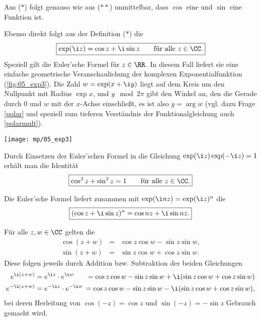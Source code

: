 \begin{antwort}
   Aus ($\ast$) folgt genauso wie aus ($\ast\ast$) unmittelbar, dass 
  $\cos$ eine  und $\sin$ eine  
  Funktion ist.

  \medskip\noindent
   Ebenso direkt folgt aus der 
  Definition ($\ast$) die 
  \[
  \boxed{
    \exp( \i z ) = \cos z + \i \sin z \qquad\text{für alle $z\in\CC$.}
  }
  \]
  Speziell gilt die Euler'sche Formel für $z\in\RR$. 
  In diesem Fall liefert sie eine einfache geometrische 
  Veranschaulichung der komplexen Exponentialfunktion (\sieheAbbildung\ref{fig:05_exp3}). Die Zahl 
  $w=\exp( x+\i y)$ liegt auf dem Kreis um den Nullpunkt mit Radius 
  $\exp x$, und $y \mod 2\pi$ gibt den Winkel an, den die Gerade 
  durch $0$ und $w$ mit der $x$-Achse einschließt, es ist also  
  $y=\arg w$ (vgl. dazu Frage \ref{polar} und speziell zum tieferen 
  Verständnis der Funktionalgleichung auch \ref{polarmult}). 

  \begin{center}
    \texttt{[image: mp/05\_exp3]}
    \label{fig:05_exp3}
  \end{center}

  \medskip\noindent
   Durch Einsetzen der Euler'schen Formel in die 
  Gleichung $\exp(\i z)\exp(-\i z)=1$ erhält man die Identität 
  \[
  \boxed{
    \cos ^2 z + \sin^2 z = 1 \qquad\text{für alle $z\in\CC$.}
  }
  \]

  \medskip\noindent
   Die Euler'sche Formel liefert zusammen mit 
  $\exp(\i nz)=\exp(\i z)^n$ die 
  \[
  \boxed{
    ( \cos z +\i\sin z)^n = \cos nz +\i \sin nz.
  }
  \]

  \medskip\noindent
   Für alle $z,w\in \CC$ gelten die  
  \[
  \boxed{
    \begin{array}{rcl}
      \cos( z+w ) &=& \cos z\cos w - \sin z\sin w, \\
      \sin( z+w ) &=& \sin z\cos w + \cos z\sin w.
    \end{array}
  }
  \]
  Diese folgen jeweils durch Addition bzw. Subtraktion der beiden 
  Gleichungen
  \begin{align}
    e^{\i(z+w)} &= e^{\i z}\cdot e^{\i w} \hspace*{-2mm} &=
    \cos z\cos w-\sin z\sin w +\i (\sin z\cos w + \cos z\sin w ) \notag \\
    e^{-\i (z+w)} &= e^{-\i z}\cdot e^{-\i w} \hspace*{-2mm} &=
    \cos z\cos w-\sin z\sin w - \i (\sin z\cos w + \cos z\sin w ), \notag
  \end{align}
  bei deren Herleitung von $\cos (-z)=\cos z$ und $\sin(-z)=-\sin z$ 
  Gebrauch gemacht wird.


\end{antwort}

